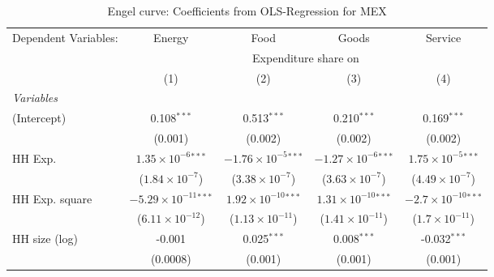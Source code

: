 
\begin{table}[htbp!]
   \centering
   \small
   \begin{adjustbox}{width = 1\textwidth, max height = 0.95\textheight, center}
      \begin{threeparttable}[b]
         \caption{\label{tab:Engel_parametric_MEX} Engel curve: Coefficients from OLS-Regression for MEX}
         \begin{tabular}{lcccc}
            \tabularnewline \midrule \midrule
            Dependent Variables: & Energy                          & Food                           & Goods                          & Service\\  
             & \multicolumn{4}{c}{Expenditure share on} \\ 
                                 & (1)                             & (2)                            & (3)                            & (4)\\  
            \midrule
            \emph{Variables}\\
            (Intercept)          & 0.108$^{***}$                   & 0.513$^{***}$                  & 0.210$^{***}$                  & 0.169$^{***}$\\   
                                 & (0.001)                         & (0.002)                        & (0.002)                        & (0.002)\\   
            HH Exp.              & $1.35\times 10^{-6}$$^{***}$    & $-1.76\times 10^{-5}$$^{***}$  & $-1.27\times 10^{-6}$$^{***}$  & $1.75\times 10^{-5}$$^{***}$\\    
                                 & ($1.84\times 10^{-7}$)          & ($3.38\times 10^{-7}$)         & ($3.63\times 10^{-7}$)         & ($4.49\times 10^{-7}$)\\    
            HH Exp. square       & $-5.29\times 10^{-11}$$^{***}$  & $1.92\times 10^{-10}$$^{***}$  & $1.31\times 10^{-10}$$^{***}$  & $-2.7\times 10^{-10}$$^{***}$\\    
                                 & ($6.11\times 10^{-12}$)         & ($1.13\times 10^{-11}$)        & ($1.41\times 10^{-11}$)        & ($1.7\times 10^{-11}$)\\    
            HH size (log)        & -0.001                          & 0.025$^{***}$                  & 0.008$^{***}$                  & -0.032$^{***}$\\   
                                 & (0.0008)                        & (0.001)                        & (0.001)                        & (0.001)\\   

\end{tabular}
\end{threeparttable}
\end{adjustbox}
\end{table}
